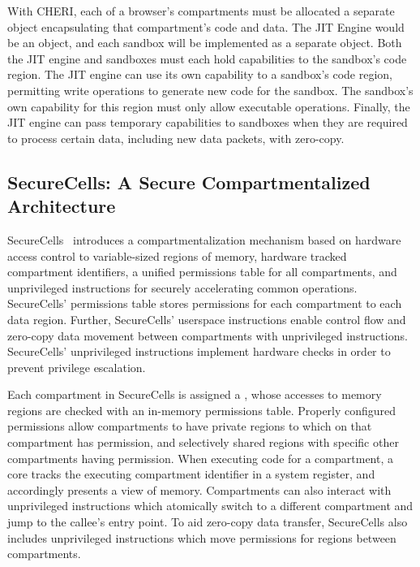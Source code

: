 With CHERI, each of a browser's compartments must be allocated a separate
object encapsulating that compartment's code and data.
The JIT Engine would be an object, and each sandbox will be implemented as
a separate object.
Both the JIT engine and sandboxes must each hold capabilities to the
sandbox's code region.
The JIT engine can use its own capability to a sandbox's code region,
permitting write operations to generate new code for the sandbox.
The sandbox's own capability for this region must only allow executable 
operations.
Finally, the JIT engine can pass temporary capabilities to sandboxes
when they are required to process certain data, including new data packets,
with zero-copy.

\subsection{SecureCells: A Secure Compartmentalized Architecture}
SecureCells~\cite{BhattacharyyaHLGSFP23} introduces a compartmentalization 
mechanism based on hardware
access control to variable-sized regions of memory, hardware tracked
compartment identifiers, a unified permissions table for all compartments,
and unprivileged instructions for securely accelerating common operations.
SecureCells' permissions table stores permissions for each compartment to
each data region.
Further, SecureCells' userspace instructions enable control flow and
zero-copy data movement between compartments with unprivileged instructions.
SecureCells' unprivileged instructions implement hardware checks in order
to prevent privilege escalation.

Each compartment in SecureCells is assigned a \secdiv{}, whose accesses
to memory regions are checked with an in-memory permissions table.
Properly configured permissions allow compartments to have private regions
to which on that compartment has permission, and selectively shared regions
with specific other compartments having permission. 
When executing code for a compartment, a core tracks the executing compartment
identifier in a system register, and accordingly presents a view of memory.
Compartments can also interact with unprivileged  instructions
which atomically  switch to a different compartment and jump to the callee's
entry point.
To aid zero-copy data transfer, SecureCells also includes unprivileged instructions
which move permissions for regions between compartments.

